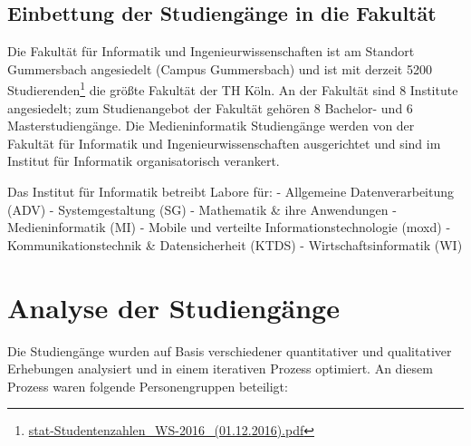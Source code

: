 \section{Einbettung der Studiengänge in die
Fakultät}\label{einbettung-der-studienguxe4nge-in-die-fakultuxe4t}

Die Fakultät für Informatik und Ingenieurwissenschaften ist am Standort
Gummersbach angesiedelt (Campus Gummersbach) und ist mit derzeit 5200
Studierenden\footnote{\href{https://th-koeln.github.io/mi-2017/anhaenge/stat-Studentenzahlen_WS-2016_(01.12.2016).pdf}{stat-Studentenzahlen\_WS-2016\_(01.12.2016).pdf}}
die größte Fakultät der TH Köln. An der Fakultät sind 8 Institute
angesiedelt; zum Studienangebot der Fakultät gehören 8 Bachelor- und 6
Masterstudiengänge. Die Medieninformatik Studiengänge werden von der
Fakultät für Informatik und Ingenieurwissenschaften ausgerichtet und
sind im Institut für Informatik organisatorisch verankert.

Das Institut für Informatik betreibt Labore für: - Allgemeine
Datenverarbeitung (ADV) - Systemgestaltung (SG) - Mathematik \& ihre
Anwendungen - Medieninformatik (MI) - Mobile und verteilte
Informationstechnologie (moxd) - Kommunikationstechnik \&
Datensicherheit (KTDS) - Wirtschaftsinformatik (WI)

\chapter{Analyse der Studiengänge}\label{analyse-der-studienguxe4nge}

Die Studiengänge wurden auf Basis verschiedener quantitativer und
qualitativer Erhebungen analysiert und in einem iterativen Prozess
optimiert. An diesem Prozess waren folgende Personengruppen beteiligt:

